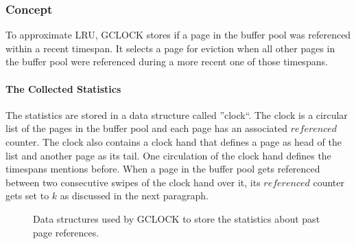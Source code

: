 \subsubsection{Concept}

    To approximate LRU, GCLOCK stores if a page in the buffer pool was referenced within a recent timespan. It selects a page for eviction when all other pages in the buffer pool were referenced during a more recent one of those timespans.

\paragraph{The Collected Statistics}

    The statistics are stored in a data structure called ''clock``. The clock is a circular list of the pages in the buffer pool and each page has an associated $referenced$ counter. The clock also contains a clock hand that defines a page as head of the list and another page as its tail. One circulation of the clock hand defines the timespans mentions before. When a page in the buffer pool gets referenced between two consecutive swipes of the clock hand over it, its $referenced$ counter gets set to $k$ as discussed in the next paragraph.

\begin{@empty}

    \begin{figure}[ht!]
        \centering
        \vspace{.5em}
        \caption{Data structures used by GCLOCK to store the statistics about past page references.}
        \label{fig:datastructuresgclock}
    \end{figure}
\end{@empty}

